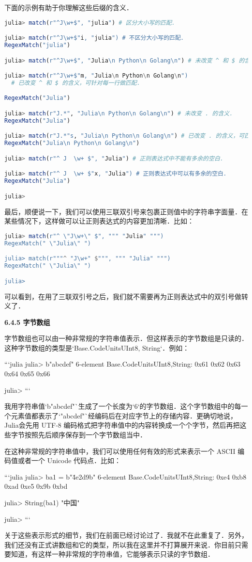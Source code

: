 下面的示例有助于你理解这些后缀的含义．
\begin{lstlisting}[language=julia]
julia> match(r"^J\w+$", "julia") # 区分大小写的匹配．

julia> match(r"^J\w+$"i, "julia") # 不区分大小写的匹配．
RegexMatch("julia")

julia> match(r"^J\w+$", "Julia\n Python\n Golang\n") # 未改变 ^ 和 $ 的含义．

julia> match(r"^J\w+$"m, "Julia\n Python\n Golang\n") 
  # 已改变 ^ 和 $ 的含义，可针对每一行做匹配．

RegexMatch("Julia")

julia> match(r"J.*", "Julia\n Python\n Golang\n") # 未改变 . 的含义．
RegexMatch("Julia")

julia> match(r"J.*"s, "Julia\n Python\n Golang\n") # 已改变 . 的含义，可匹配换行．
RegexMatch("Julia\n Python\n Golang\n")

julia> match(r"^ J  \w+ $", "Julia") # 正则表达式中不能有多余的空白．

julia> match(r"^ J  \w+ $"x, "Julia") # 正则表达式中可以有多余的空白．
RegexMatch("Julia")

julia> 
\end{lstlisting}

最后，顺便说一下，我们可以使用三联双引号来包裹正则值中的字符串字面量．在某些情况下，这样做可以让正则表达式的内容更加清晰．比如：
\begin{lstlisting}[language=julia]
julia> match(r"^ \"J\w+\" $", """ "Julia" """)
RegexMatch(" \"Julia\" ")

julia> match(r"""^ "J\w+" $""", """ "Julia" """)
RegexMatch(" \"Julia\" ")

julia> 
\end{lstlisting}

可以看到，在用了三联双引号之后，我们就不需要再为正则表达式中的双引号做转义了．

\textbf{6.4.5 字节数组}

字节数组也可以由一种非常规的字符串值表示．但这样表示的字节数组是只读的．这种字节数组的类型是`Base.CodeUnits{UInt8, String}`．例如：

```julia
julia> b"abcdef"
6-element Base.CodeUnits{UInt8,String}:
 0x61
 0x62
 0x63
 0x64
 0x65
 0x66

julia>
```

我用字符串值`b"abcdef"`生成了一个长度为`6`的字节数组．这个字节数组中的每一个元素值都表示了`"abcdef"`经编码后在对应字节上的存储内容．更确切地说，Julia会先用 UTF-8 编码格式把字符串值中的内容转换成一个个字节，然后再把这些字节按照先后顺序保存到一个字节数组当中．

在这种非常规的字符串值中，我们可以使用任何有效的形式来表示一个 ASCII 编码值或者一个 Unicode 代码点．比如：

```julia
julia> ba1 = b"\u4e2d\x9b\xbd"
6-element Base.CodeUnits{UInt8,String}:
 0xe4
 0xb8
 0xad
 0xe5
 0x9b
 0xbd

julia> String(ba1)
"中国"

julia>
```

关于这些表示形式的细节，我们在前面已经讨论过了．我就不在此重复了．另外，我们还没有正式讲数组和它的类型，所以我在这里并不打算展开来说．你目前只需要知道，有这样一种非常规的字符串值，它能够表示只读的字节数组．